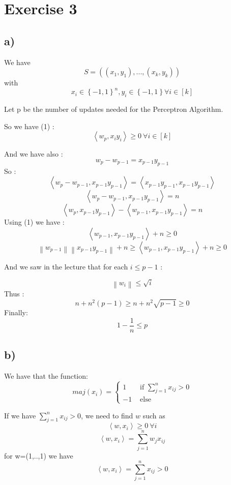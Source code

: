 
\section*{Exercise 3}

\subsection*{a)}  %

We have \[S=((x_{1},y_{1}), ..., (x_{k},y_{k}))\]  with \[x_{i}\in \left \{ -1, 1 \right \}^{n} , y_{i}\in \left \{ -1, 1 \right \} \forall i\in [k]\]

Let p be the number of updates needed for the Perceptron Algorithm. 

So we have (1) : \[\left \langle w_{p},x_{i}y_{i} \right \rangle\geq 0 \  \forall i\in [k]\] 

And we have also : \[w_{p}-w_{p-1}=x_{p-1}y_{p-1}\]
So : 
\[\left \langle w_{p}-w_{p-1},x_{p-1}y_{p-1} \right \rangle=\left \langle x_{p-1}y_{p-1}, x_{p-1}y_{p-1}\right\rangle\]
\[\left \langle w_{p}-w_{p-1},x_{p-1}y_{p-1} \right \rangle=n\]
\[\left \langle w_{p},x_{p-1}y_{p-1} \right \rangle - \left \langle w_{p-1},x_{p-1}y_{p-1} \right \rangle=n\]
Using (1) we have :\[\left \langle w_{p-1},x_{p-1}y_{p-1} \right \rangle + n \geq 0 \]
\[\left \| w_{p-1} \right \| \left \| x_{p-1}y_{p-1} \right \| + n \geq \left \langle w_{p-1},x_{p-1}y_{p-1} \right \rangle + n \geq 0\]

And we saw in the lecture that for each $i\leq p-1$ :

\[\left \| w_{i} \right \| \leq \sqrt{i}\]
 Thus :
 \[n+ n^{2}(p-1) \geq n+ n^{2}\sqrt{p-1}\geq 0\]
Finally:
\[1-\frac{1}{n}\leq p\]

 

\subsection*{b)}
We have that the function: \[maj(x_{i})=\begin{cases} 1 & \text{ if } \sum_{j=1 }^{n}x_{ij}> 0 \\ -1 & \text{ else } \end{cases}\]

If we have $\sum_{j=1 }^{n}x_{ij}> 0$, we need to find $w$ such as  \[\left \langle w,x_{i} \right \rangle\geq 0 \  \forall i\]
\[\left \langle w,x_{i} \right \rangle =\sum_{j=1}^{n}w_{j}x_{ij}\]
for w=(1,..,1) we have \[\left \langle w,x_{i} \right \rangle =\sum_{j=1 }^{n}x_{ij}> 0\]

